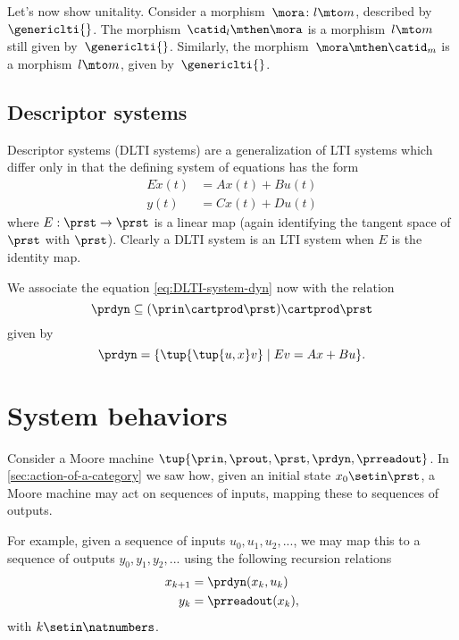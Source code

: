 \begin{solution}
    Let's now show unitality.
    Consider a morphism~$\mora\colon l\mto m$, described by~$\genericlti{}$.
    The morphism~$\catid_l \mthen \mora$ is a morphism~$l\mto m$ still given by~$\genericlti{}$.
    Similarly, the morphism~$\mora\mthen \catid_m$ is a morphism~$l\mto m$, given by~$\genericlti{}$.
\end{solution}

\subsection{Descriptor systems}

Descriptor systems (DLTI systems) are a generalization of LTI systems which differ only in that the defining system of equations has the form
\begin{align}
    E \dot x(t) & = Ax(t) + Bu(t) \label{eq:DLTI-system-dyn} \\
    y(t)        & = Cx(t) + Du(t) \label{eq:DLTI-system-ro}
\end{align}
where $E: \prst \to \prst$ is a linear map (again identifying the tangent space of $\prst$ with $\prst$).
Clearly a DLTI system is an LTI system when $E$ is the identity map.

We associate the equation \cref{eq:DLTI-system-dyn} now with the relation
\begin{equation}
    \prdyn \subseteq  (\prin \cartprod \prst) \cartprod \prst
\end{equation}
given by
\begin{equation}
    \prdyn = \{ \tup{ \tup{u, x} v} \mid E v = Ax + Bu \}.
\end{equation}

\section{System behaviors}


Consider a Moore machine $\tup{\prin, \prout, \prst, \prdyn, \prreadout}$.
In \cref{sec:action-of-a-category} we saw how, given an initial state $x_0 \setin \prst$, a Moore machine may act on sequences of inputs, mapping these to sequences of outputs.

For example, given a sequence of inputs $u_0, u_1, u_2, .
    .. $, we may map this to a sequence of outputs $y_0, y_1, y_2, ... $ using the following recursion relations
\begin{align}
    x_{k+1} & = \prdyn(x_k, u_k) \label{eq:state-recursion-1} \\
    y_{k}   & = \prreadout(x_{k}), \label{eq:state-recursion-2}
\end{align}
with $k \setin \natnumbers$.

